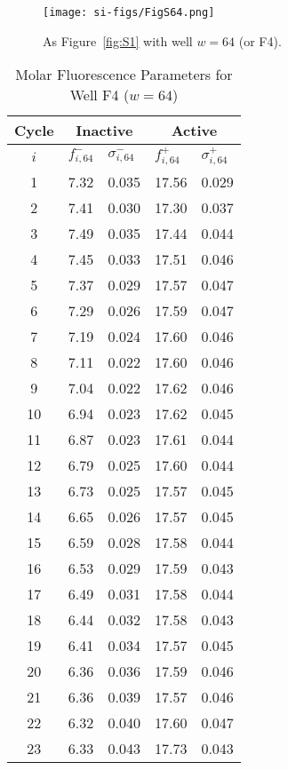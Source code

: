                 \begin{figure}
                    \centering
                    \texttt{[image: si-figs/FigS64.png]}
                    \caption{
                        As Figure~\ref{fig:S1} with well $w=64$ (or F4).
                    }
                \end{figure}
                \clearpage
    \begin{table}
        \caption{Molar Fluorescence Parameters for Well F4 ($w=64$)}
        \centering
        \begin{tabular}{c|ll|ll}
            Cycle & \multicolumn{2}{c|}{Inactive} & \multicolumn{2}{c}{Active} \\
            \hline
            $i$ & $f_{i,64}^{-}$ & $\sigma_{i,64}^{-}$ &  $f_{i,64}^{+}$ & $\sigma_{i,64}^{+}$ \\
            \hline
    1 & 7.32 & 0.035 & 17.56 & 0.029 \\
2 & 7.41 & 0.030 & 17.30 & 0.037 \\
3 & 7.49 & 0.035 & 17.44 & 0.044 \\
4 & 7.45 & 0.033 & 17.51 & 0.046 \\
5 & 7.37 & 0.029 & 17.57 & 0.047 \\
6 & 7.29 & 0.026 & 17.59 & 0.047 \\
7 & 7.19 & 0.024 & 17.60 & 0.046 \\
8 & 7.11 & 0.022 & 17.60 & 0.046 \\
9 & 7.04 & 0.022 & 17.62 & 0.046 \\
10 & 6.94 & 0.023 & 17.62 & 0.045 \\
11 & 6.87 & 0.023 & 17.61 & 0.044 \\
12 & 6.79 & 0.025 & 17.60 & 0.044 \\
13 & 6.73 & 0.025 & 17.57 & 0.045 \\
14 & 6.65 & 0.026 & 17.57 & 0.045 \\
15 & 6.59 & 0.028 & 17.58 & 0.044 \\
16 & 6.53 & 0.029 & 17.59 & 0.043 \\
17 & 6.49 & 0.031 & 17.58 & 0.044 \\
18 & 6.44 & 0.032 & 17.58 & 0.043 \\
19 & 6.41 & 0.034 & 17.57 & 0.045 \\
20 & 6.36 & 0.036 & 17.59 & 0.046 \\
21 & 6.36 & 0.039 & 17.57 & 0.046 \\
22 & 6.32 & 0.040 & 17.60 & 0.047 \\
23 & 6.33 & 0.043 & 17.73 & 0.043 \\

\end{tabular}
\end{table}
